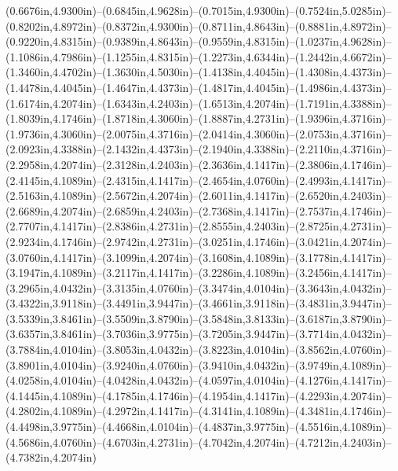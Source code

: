 (0.6676in,4.9300in)--(0.6845in,4.9628in)--(0.7015in,4.9300in)--(0.7524in,5.0285in)--(0.8202in,4.8972in)--(0.8372in,4.9300in)--(0.8711in,4.8643in)--(0.8881in,4.8972in)--(0.9220in,4.8315in)--(0.9389in,4.8643in)--(0.9559in,4.8315in)--(1.0237in,4.9628in)--(1.1086in,4.7986in)--(1.1255in,4.8315in)--(1.2273in,4.6344in)--(1.2442in,4.6672in)--(1.3460in,4.4702in)--(1.3630in,4.5030in)--(1.4138in,4.4045in)--(1.4308in,4.4373in)--(1.4478in,4.4045in)--(1.4647in,4.4373in)--(1.4817in,4.4045in)--(1.4986in,4.4373in)--(1.6174in,4.2074in)--(1.6343in,4.2403in)--(1.6513in,4.2074in)--(1.7191in,4.3388in)--(1.8039in,4.1746in)--(1.8718in,4.3060in)--(1.8887in,4.2731in)--(1.9396in,4.3716in)--(1.9736in,4.3060in)--(2.0075in,4.3716in)--(2.0414in,4.3060in)--(2.0753in,4.3716in)--(2.0923in,4.3388in)--(2.1432in,4.4373in)--(2.1940in,4.3388in)--(2.2110in,4.3716in)--(2.2958in,4.2074in)--(2.3128in,4.2403in)--(2.3636in,4.1417in)--(2.3806in,4.1746in)--(2.4145in,4.1089in)--(2.4315in,4.1417in)--(2.4654in,4.0760in)--(2.4993in,4.1417in)--(2.5163in,4.1089in)--(2.5672in,4.2074in)--(2.6011in,4.1417in)--(2.6520in,4.2403in)--(2.6689in,4.2074in)--(2.6859in,4.2403in)--(2.7368in,4.1417in)--(2.7537in,4.1746in)--(2.7707in,4.1417in)--(2.8386in,4.2731in)--(2.8555in,4.2403in)--(2.8725in,4.2731in)--(2.9234in,4.1746in)--(2.9742in,4.2731in)--(3.0251in,4.1746in)--(3.0421in,4.2074in)--(3.0760in,4.1417in)--(3.1099in,4.2074in)--(3.1608in,4.1089in)--(3.1778in,4.1417in)--(3.1947in,4.1089in)--(3.2117in,4.1417in)--(3.2286in,4.1089in)--(3.2456in,4.1417in)--(3.2965in,4.0432in)--(3.3135in,4.0760in)--(3.3474in,4.0104in)--(3.3643in,4.0432in)--(3.4322in,3.9118in)--(3.4491in,3.9447in)--(3.4661in,3.9118in)--(3.4831in,3.9447in)--(3.5339in,3.8461in)--(3.5509in,3.8790in)--(3.5848in,3.8133in)--(3.6187in,3.8790in)--(3.6357in,3.8461in)--(3.7036in,3.9775in)--(3.7205in,3.9447in)--(3.7714in,4.0432in)--(3.7884in,4.0104in)--(3.8053in,4.0432in)--(3.8223in,4.0104in)--(3.8562in,4.0760in)--(3.8901in,4.0104in)--(3.9240in,4.0760in)--(3.9410in,4.0432in)--(3.9749in,4.1089in)--(4.0258in,4.0104in)--(4.0428in,4.0432in)--(4.0597in,4.0104in)--(4.1276in,4.1417in)--(4.1445in,4.1089in)--(4.1785in,4.1746in)--(4.1954in,4.1417in)--(4.2293in,4.2074in)--(4.2802in,4.1089in)--(4.2972in,4.1417in)--(4.3141in,4.1089in)--(4.3481in,4.1746in)--(4.4498in,3.9775in)--(4.4668in,4.0104in)--(4.4837in,3.9775in)--(4.5516in,4.1089in)--(4.5686in,4.0760in)--(4.6703in,4.2731in)--(4.7042in,4.2074in)--(4.7212in,4.2403in)--(4.7382in,4.2074in)
